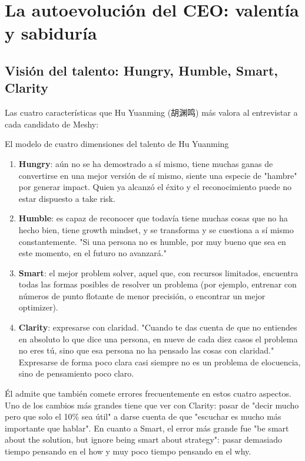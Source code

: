 \section{La autoevolución del CEO: valentía y sabiduría}

\subsection{Visión del talento: Hungry, Humble, Smart, Clarity}

Las cuatro características que Hu Yuanming (胡渊鸣) más valora al entrevistar a cada candidato de Meshy:

\begin{importantbox}{El modelo de cuatro dimensiones del talento de Hu Yuanming}
\begin{enumerate}
\item \textbf{Hungry}: aún no se ha demostrado a sí mismo, tiene muchas ganas de convertirse en una mejor versión de sí mismo, siente una especie de "hambre" por generar impact. Quien ya alcanzó el éxito y el reconocimiento puede no estar dispuesto a take risk.
\item \textbf{Humble}: es capaz de reconocer que todavía tiene muchas cosas que no ha hecho bien, tiene growth mindset, y se transforma y se cuestiona a sí mismo constantemente. "Si una persona no es humble, por muy bueno que sea en este momento, en el futuro no avanzará."
\item \textbf{Smart}: el mejor problem solver, aquel que, con recursos limitados, encuentra todas las formas posibles de resolver un problema (por ejemplo, entrenar con números de punto flotante de menor precisión, o encontrar un mejor optimizer).
\item \textbf{Clarity}: expresarse con claridad. "Cuando te das cuenta de que no entiendes en absoluto lo que dice una persona, en nueve de cada diez casos el problema no eres tú, sino que esa persona no ha pensado las cosas con claridad." Expresarse de forma poco clara casi siempre no es un problema de elocuencia, sino de pensamiento poco claro.
\end{enumerate}
\end{importantbox}

Él admite que también comete errores frecuentemente en estos cuatro aspectos. Uno de los cambios más grandes tiene que ver con Clarity: pasar de "decir mucho pero que solo el 10\% sea útil" a darse cuenta de que "escuchar es mucho más importante que hablar". En cuanto a Smart, el error más grande fue "be smart about the solution, but ignore being smart about strategy": pasar demasiado tiempo pensando en el how y muy poco tiempo pensando en el why.

